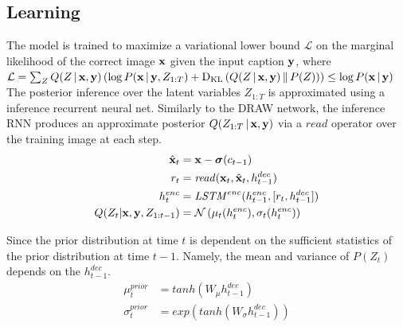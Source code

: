 \documentclass{article} %
\newcommand{\given}{\,|\,}
\newcommand{\kldiv}{\mathrm{D}_{\rm KL}}
\newcommand{\klBars}{\,\|\,}
\newcommand{\sigmoid}{\boldsymbol{\sigma}}
\newcommand{\hdec}{h^{dec}}
\newcommand{\henc}{h^{enc}}
\newcommand{\readop}{\mathit{read}}
\newcommand{\encoder}{\mathit{LSTM}^{enc}}
\newcommand{\canv}{c}
\newcommand{\Lat}{Z}
\newcommand{\icaption}{{\bf{y}}}
\newcommand{\oimage}{{\bf{x}}}
\newcommand{\post}{Q}
\newcommand{\prior}{P}
\newcommand{\loss}{\mathcal{L}}
\newcommand{\lloss}{\mathcal{L}^{z}}
\newcommand{\rloss}{\mathcal{L}^{x}}
\begin{document}
\subsection{Learning}

The model is trained to maximize a variational lower bound $\loss$ on the marginal likelihood of the correct image $\oimage$ given the input caption $\icaption$, where $\loss = \sum_{\Lat}Q(\Lat\given\oimage,\icaption)\left(\log P(\oimage\given\icaption, \Lat_{1:T}) + \kldiv\left(Q(\Lat\given\oimage,\icaption)\klBars P(\Lat)\right)\right) \le \log P(\oimage\given\icaption)$ The posterior inference over the latent variables $\Lat_{1:T}$ is approximated using a inference recurrent neural net. Similarly to the DRAW network, the inference RNN produces an approximate posterior $Q(\Lat_{1:T}\given\oimage,\icaption)$ via a $\readop$ operator over the training image at each step. 
\begin{align}
\label{eq:x_hat}
\hat{\oimage}_t &= \oimage-\sigmoid(\canv_{t-1})\\
\label{eq:read}
r_t &= \readop(\oimage_t, \hat{\oimage}_t, \hdec_{t-1})\\
\henc_t &= \encoder(\henc_{t-1}, [r_t, \hdec_{t-1}])\\
\post(\Lat_t|\oimage,\icaption,\Lat_{1:t-1}) &= \mathcal{N}\left(\mu_t(\henc_t), \sigma_t(\henc_t)\right)
\end{align}



Since the prior distribution at time $t$ is dependent on the sufficient statistics of the prior distribution at time $t-1$. Namely, the mean and variance of $\prior(\Lat_t)$ depends on the $\hdec_{t-1}$. 
\begin{align}
\mu_{t}^{prior} &= tanh(W_{\mu}\hdec_{t-1})\\
\sigma_{t}^{prior} &= exp(tanh(W_{\sigma}\hdec_{t-1})) 
\end{align}
\end{document}
